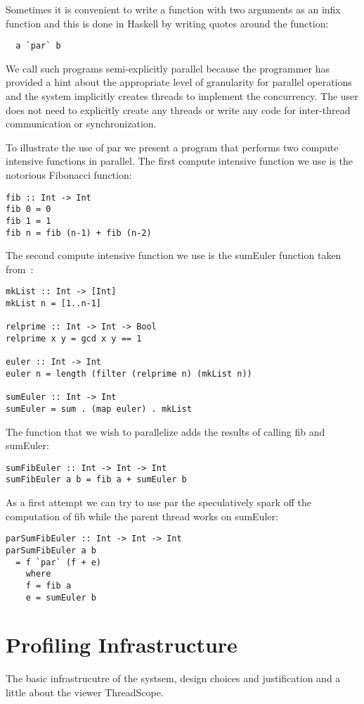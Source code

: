 \documentclass[twocolumn,9pt]{sigplanconf}
\newcommand{\codef}[1]{{\fontfamily{cmss}\small#1}}
\begin{document}
Sometimes it is convenient to write a function with two arguments as an infix function and this is done in Haskell by writing quotes around the function:
\begin{lstlisting}
  a `par` b
\end{lstlisting}

We call such programs semi-explicitly parallel because the programmer has provided a hint about the appropriate level of granularity for parallel operations and the system implicitly creates threads to implement the concurrency. The user does not need to explicitly create any threads or write any code for inter-thread communication or synchronization.

To illustrate the use of \codef{par} we present a program that performs two compute intensive functions in parallel. The first compute intensive function we use is the notorious Fibonacci function:
\begin{lstlisting}
fib :: Int -> Int
fib 0 = 0
fib 1 = 1
fib n = fib (n-1) + fib (n-2)
\end{lstlisting}
The second compute intensive function we use is the \codef{sumEuler} function taken from~\cite{trinder:02}:
\begin{lstlisting}
mkList :: Int -> [Int]
mkList n = [1..n-1]

relprime :: Int -> Int -> Bool
relprime x y = gcd x y == 1

euler :: Int -> Int
euler n = length (filter (relprime n) (mkList n))

sumEuler :: Int -> Int
sumEuler = sum . (map euler) . mkList
\end{lstlisting}
The function that we wish to parallelize adds the results of calling \codef{fib} and \codef{sumEuler}:
\begin{lstlisting}
sumFibEuler :: Int -> Int -> Int
sumFibEuler a b = fib a + sumEuler b
\end{lstlisting}
As a first attempt we can try to use \codef{par} the speculatively spark off the computation of \codef{fib} while the parent thread works on \codef{sumEuler}:
\begin{lstlisting}
parSumFibEuler :: Int -> Int -> Int
parSumFibEuler a b
  = f `par` (f + e)
    where
    f = fib a
    e = sumEuler b
\end{lstlisting}

\section{Profiling Infrastructure}
The basic infrastrucutre of the systsem, design choices and justification and a little about the viewer ThreadScope.
\end{document}
